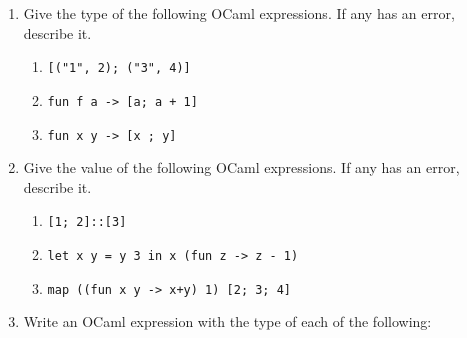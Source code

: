 \documentclass[11pt]{article}
\begin{document}

  \enlargethispage{3mm}

  \vspace{-3mm}

  \begin{enumerate}

    \addtolength{\itemsep}{5mm}

    \item Give the type of the following OCaml expressions.  If any has an
          error, describe it.

          \vspace{-2.5mm}

          \begin{enumerate}

            \addtolength{\itemsep}{0mm}

            \item \texttt{[("1", 2); ("3", 4)]}

            \item \texttt{fun f a -> [a; a + 1]}

            \item \texttt{fun x y -> [x ; y]}

          \end{enumerate}

          \vspace{-2.5mm}

    \item Give the value of the following OCaml expressions.  If any has an
          error, describe it.

          \vspace{-2.5mm}

          \begin{enumerate}

            \addtolength{\itemsep}{0mm}

            \item \texttt{[1; 2]::[3]}

            \item \texttt{let x y = y 3 in x (fun z -> z - 1)}

            \item \texttt{map ((fun x y -> x+y) 1) [2; 3; 4]}

          \end{enumerate}

          \vspace{-2.5mm}

    \item Write an OCaml expression with the type of each of the following:


\end{enumerate}
\end{document}
